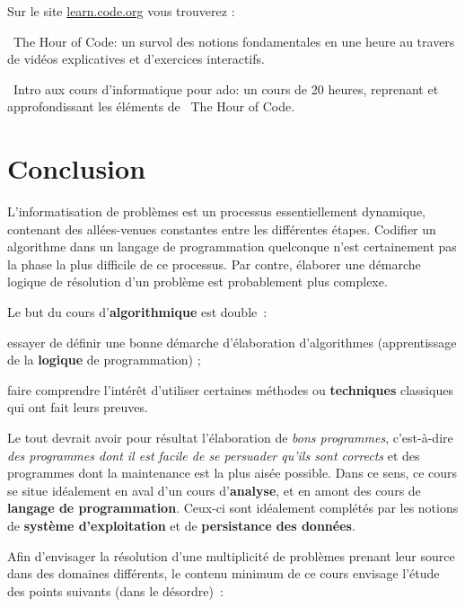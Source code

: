 	Sur le site \url{learn.code.org} vous trouverez :
	\begin{liste}
	\item
		\og\ The Hour of Code\fg : 
		un survol des notions fondamentales en une heure
		au travers de vidéos explicatives
		et d'exercices interactifs.
	\item
		\og\ Intro aux cours d'informatique pour ado\fg : 
		un cours de 20 heures, 
		reprenant et approfondissant les éléments
		de \og\ The Hour of Code\fg.
	\end{liste}
	
	
\section{Conclusion}

	L’informatisation de problèmes est un processus essentiellement
	dynamique, contenant des allées-venues constantes entre les différentes
	étapes. Codifier un algorithme dans un langage de programmation
	quelconque n’est certainement pas la phase la plus difficile de ce
	processus. Par contre, élaborer une démarche logique de résolution d’un
	problème est probablement plus complexe.
	
	Le but du cours d'\textbf{algorithmique} est double~:

	\begin{liste}
	\item
		essayer de définir une bonne démarche d’élaboration d’algorithmes
		(apprentissage de la \textbf{logique} de programmation) ;
	\item
		faire comprendre l’intérêt d’utiliser certaines méthodes ou
		\textbf{techniques} classiques qui ont fait leurs preuves.
	\end{liste}

	Le tout devrait avoir pour résultat l’élaboration de \textit{bons
	programmes}, c’est-à-dire \textit{des programmes dont il est facile de
	se persuader qu’ils sont corrects} et des programmes dont la
	maintenance est la plus aisée possible. Dans ce sens, ce cours se situe
	idéalement en aval d’un cours d’\textbf{analyse}, et en amont des cours
	de \textbf{langage de programmation}. Ceux-ci sont idéalement complétés
	par les notions de \textbf{système d’exploitation} et de
	\textbf{persistance des données}.

	Afin d’envisager la résolution d’une multiplicité de problèmes prenant
	leur source dans des domaines différents, le contenu minimum de ce
	cours envisage l’étude des points suivants (dans le désordre)~:

